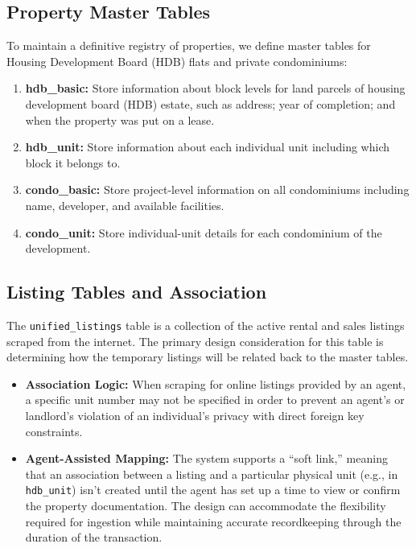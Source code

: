 \subsection{Property Master Tables}
To maintain a definitive registry of properties, we define master tables for Housing Development Board (HDB) flats and private condominiums:
\begin{enumerate}
    \item \textbf{hdb\_basic:} Store information about block levels for land parcels of housing development board (HDB) estate, such as address; year of completion; and when the property was put on a lease.
    \item \textbf{hdb\_unit:} Store information about each individual unit including which block it belongs to.
    \item \textbf{condo\_basic:} Store project-level information on all condominiums including name, developer, and available facilities.
    \item \textbf{condo\_unit:} Store individual-unit details for each condominium of the development.
\end{enumerate}

\subsection{Listing Tables and Association}
The \texttt{unified\_listings} table is a collection of the active rental and 
sales listings scraped from the internet. The primary design consideration for 
this table is determining how the temporary listings will be related back to 
the master tables.

\begin{itemize}
    \item \textbf{Association Logic:} When scraping for online listings provided by an agent, a specific unit number may not be specified in order to prevent an agent's or landlord's violation of an individual's privacy with direct foreign key constraints.
    \item \textbf{Agent-Assisted Mapping:} The system supports a ``soft link,'' meaning that an association between a 
    listing and a particular physical unit (e.g., in \texttt{hdb\_unit}) isn't created until the agent has set up a time to view or confirm the property documentation. The design can accommodate the flexibility required for ingestion while maintaining accurate recordkeeping through the duration of the transaction.
\end{itemize}


